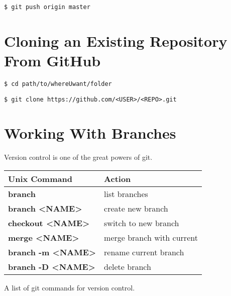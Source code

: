 \documentclass{tufte-handout}
\begin{document}
\begin{shaded}
\begin{verbatim}
$ git push origin master
\end{verbatim}
\end{shaded}


\newpage

\section{Cloning an Existing Repository From GitHub }


\begin{shaded}
\begin{verbatim}
$ cd path/to/whereUwant/folder
\end{verbatim}
\end{shaded}

\begin{shaded}
\begin{verbatim}
$ git clone https://github.com/<USER>/<REPO>.git
\end{verbatim}
\end{shaded}

\vspace{1cm}

\section{Working With Branches }
Version control is one of the great powers of git.

\begin{margintable}[80pt]
  \footnotesize%
  \begin{center}
    \begin{tabular}{ll}
      \toprule
     Unix Command & Action \\
      \midrule
     \bf{branch}  & list branches       \\
    \bf{branch} <NAME>  & create new branch        \\
    \bf{checkout} <NAME>  & switch to new branch        \\
     \bf{merge} <NAME>  & merge branch with current      \\
      \bf{branch -m} <NAME>  & rename current branch \\
      \bf{branch -D} <NAME>  & delete branch       \\
      \bottomrule
    \end{tabular}
  \end{center}
  \caption{A list of git commands for version control.}
  \label{tab:font-sizes}
\end{margintable}
\end{document}
